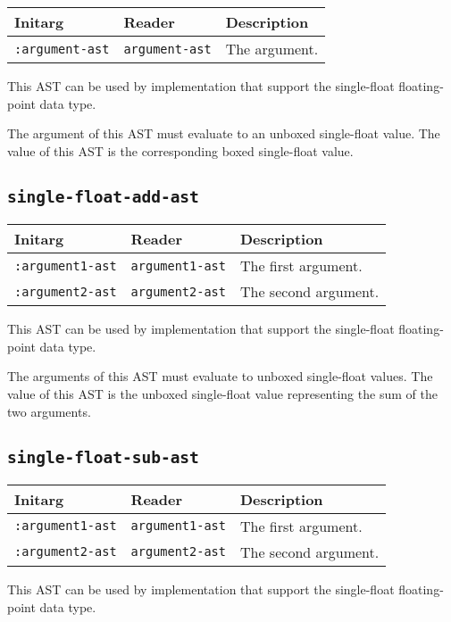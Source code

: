 \begin{tabular}{|l|l|l|}
\hline
Initarg & Reader & Description\\
\hline\hline
\texttt{:argument-ast} & \texttt{argument-ast} & The argument.\\
\hline
\end{tabular}

This AST can be used by implementation that support the single-float
floating-point data type.  

The argument of this AST must evaluate to an unboxed single-float
value.  The value of this AST is the corresponding boxed single-float
value.

\subsection{\texttt{single-float-add-ast}}
\label{sec-ast-single-float-add}

\begin{tabular}{|l|l|l|}
\hline
Initarg & Reader & Description\\
\hline\hline
\texttt{:argument1-ast} & \texttt{argument1-ast} & The first argument.\\
\hline
\texttt{:argument2-ast} & \texttt{argument2-ast} & The second argument.\\
\hline
\end{tabular}

This AST can be used by implementation that support the single-float
floating-point data type.  

The arguments of this AST must evaluate to unboxed single-float
values.  The value of this AST is the unboxed single-float value
representing the sum of the two arguments.

\subsection{\texttt{single-float-sub-ast}}
\label{sec-ast-single-float-sub}

\begin{tabular}{|l|l|l|}
\hline
Initarg & Reader & Description\\
\hline\hline
\texttt{:argument1-ast} & \texttt{argument1-ast} & The first argument.\\
\hline
\texttt{:argument2-ast} & \texttt{argument2-ast} & The second argument.\\
\hline
\end{tabular}

This AST can be used by implementation that support the single-float
floating-point data type.  


